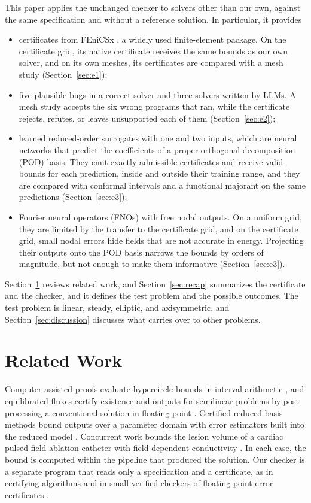 \documentclass[11pt]{article}
\begin{document}
This paper applies the unchanged checker to solvers other than our own, against the
same specification and without a reference solution. In particular, it provides
\begin{itemize}
\item certificates from FEniCSx \cite{baratta2023}, a widely used finite-element
package. On the certificate grid, its native certificate receives the same bounds as
our own solver, and on its own meshes, its certificates are compared with a mesh
study (Section~\ref{sec:e1});
\item five plausible bugs in a correct solver and three solvers written by LLMs. A
mesh study accepts the six wrong programs that ran, while the certificate rejects,
refutes, or leaves unsupported each of them (Section~\ref{sec:e2});
\item learned reduced-order surrogates with one and two inputs, which are neural
networks that predict the coefficients of a proper orthogonal decomposition (POD)
basis. They emit exactly admissible certificates and receive valid bounds for each
prediction, inside and outside their training range, and they are compared with
conformal intervals and a functional majorant on the same predictions
(Section~\ref{sec:e3});
\item Fourier neural operators (FNOs) with free nodal outputs. On a uniform grid,
they are limited by the transfer to the certificate grid, and on the certificate
grid, small nodal errors hide fields that are not accurate in energy. Projecting
their outputs onto the POD basis narrows the bounds by orders of magnitude, but not
enough to make them informative (Section~\ref{sec:e3}).
\end{itemize}
Section~\ref{sec:related} reviews related work, and Section~\ref{sec:recap}
summarizes the certificate and the checker, and it defines the test problem and the
possible outcomes. The test problem is linear, steady, elliptic, and axisymmetric, and
Section~\ref{sec:discussion} discusses what carries over to other problems.

\section{Related Work}\label{sec:related}

Computer-assisted proofs evaluate hypercircle bounds in interval arithmetic
\cite{liuoishi2013,liu2021stokes,nakao2019}, and equilibrated fluxes certify
existence and outputs for semilinear problems by post-processing a conventional
solution in floating point \cite{ishizaka2026}. Certified
reduced-basis methods bound outputs over a parameter domain with error estimators
built into the reduced model \cite{rozza2008}. Concurrent work bounds the lesion
volume of a cardiac pulsed-field-ablation catheter with field-dependent conductivity
\cite{talleb2026}. In each case, the bound is computed within the pipeline that
produced the solution. Our checker is a separate program that reads
only a specification and a certificate, as in certifying algorithms
\cite{mcconnell2011} and in small verified checkers of floating-point error
certificates \cite{becker2018}.
\end{document}
